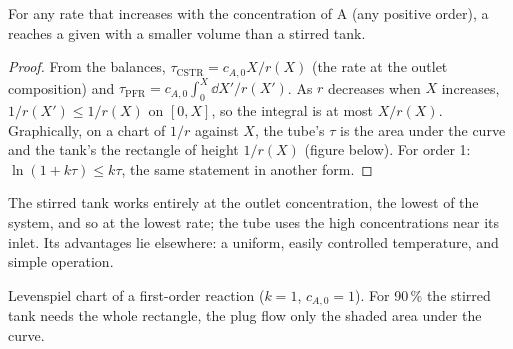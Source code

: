 \begin{proposition}\label{prop:b2:continuous-reactors:compare}
For any rate that increases with the concentration of A (any positive
order), a  reaches a given  with a smaller volume
than a stirred tank.
\end{proposition}

\begin{proof}
From the balances, $\tau_{\text{CSTR}} = c_{A,0}X/r(X)$ (the rate at the outlet
composition) and $\tau_{\text{PFR}} = c_{A,0}\int_0^X\dd X'/r(X')$. As $r$
decreases when $X$ increases, $1/r(X') \leq 1/r(X)$ on $[0, X]$, so the
integral is at most $X/r(X)$. Graphically, on a chart of $1/r$ against $X$, the
tube's $\tau$ is the area under the curve and the tank's the rectangle of
height $1/r(X)$ (figure below). For order 1: $\ln(1 + k\tau) \leq k\tau$, the
same statement in another form.
\end{proof}

The stirred tank works entirely at the outlet concentration, the lowest of
the system, and so at the lowest rate; the tube uses the high concentrations
near its inlet. Its advantages lie elsewhere: a uniform, easily controlled
temperature, and simple operation.

\begin{omfigure}

{\small Levenspiel chart of a first-order reaction ($k = 1$, $c_{A,0} = 1$).
For 90\,\%  the stirred tank needs the whole rectangle, the plug
flow only the shaded area under the curve.}
\end{omfigure}

